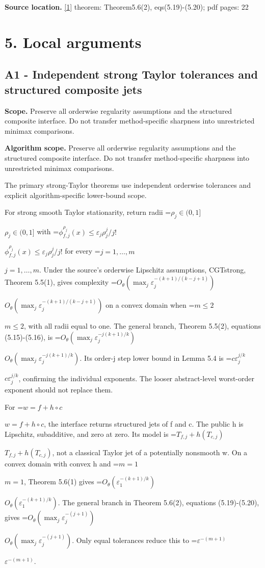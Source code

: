 \documentclass[10pt,a4paper]{article}
\newcommand{\AtlasMath}[1]{\par\begingroup\centering\setbox0=\hbox{$\displaystyle #1$}\ifdim\wd0>1.4\linewidth\typeout{ATLAS WIDE FORMULA: \the\wd0}\fi\ifdim\wd0>\linewidth\resizebox{\linewidth}{!}{\box0}\else\box0\fi\par\endgroup}
\newcommand{\AtlasInlineMath}[1]{\begingroup\setbox0=\hbox{$#1$}\ifdim\wd0>.4\linewidth\endgroup\AtlasMath{#1}\else\endgroup$#1$\fi}
\begin{document}
\textbf{Source location.} \href{https://optimization-online.org/wp-content/uploads/2020/01/7590.pdf}{[1]} theorem: Theorem5.6(2), eqs(5.19)-(5.20); pdf pages: 22

\section{5. Local arguments}
\subsection{A1 - Independent strong Taylor tolerances and structured composite jets}
\textbf{Scope.} Preserve all orderwise regularity assumptions and the structured composite interface. Do not transfer method-specific sharpness into unrestricted minimax comparisons.

\textbf{Algorithm scope.} Preserve all orderwise regularity assumptions and the structured composite interface. Do not transfer method-specific sharpness into unrestricted minimax comparisons.

The primary strong-Taylor theorems use independent orderwise tolerances and explicit algorithm-specific lower-bound scope.

For strong smooth Taylor stationarity, return radii \AtlasInlineMath{\rho_j\in(0,1]} with \AtlasInlineMath{\phi_{f,j}^{\rho_j}(x)\le\varepsilon_j\rho_j^j/j!} for every \AtlasInlineMath{j=1,\ldots,m}. Under the source's orderwise Lipschitz assumptions, CGTstrong, Theorem 5.5(1), gives complexity \AtlasInlineMath{O_\theta(\max_j\varepsilon_j^{-(k+1)/(k-j+1)})} on a convex domain when \AtlasInlineMath{m\le2}, with all radii equal to one. The general branch, Theorem 5.5(2), equations (5.15)-(5.16), is \AtlasInlineMath{O_\theta(\max_j\varepsilon_j^{-j(k+1)/k})}. Its order-j step lower bound in Lemma 5.4 is \AtlasInlineMath{c\varepsilon_j^{j/k}}, confirming the individual exponents. The looser abstract-level worst-order exponent should not replace them.

For \AtlasInlineMath{w=f+h\circ c}, the interface returns structured jets of f and c. The public h is Lipschitz, subadditive, and zero at zero. Its model is \AtlasInlineMath{T_{f,j}+h(T_{c,j})}, not a classical Taylor jet of a potentially nonsmooth w. On a convex domain with convex h and \AtlasInlineMath{m=1}, Theorem 5.6(1) gives \AtlasInlineMath{O_{\theta}(\varepsilon_1^{-(k+1)/k})}. The general branch in Theorem 5.6(2), equations (5.19)-(5.20), gives \AtlasInlineMath{O_\theta(\max_j\varepsilon_j^{-(j+1)})}. Only equal tolerances reduce this to \AtlasInlineMath{\varepsilon^{-(m+1)}}.
\end{document}
